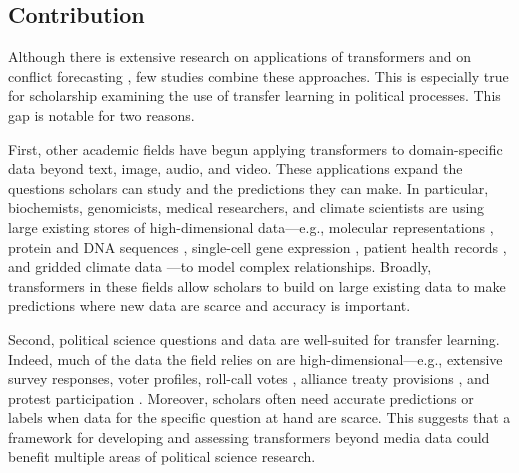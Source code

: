 \documentclass[11pt, letterpaper]{article}
\begin{document}
\subsection{Contribution}
Although there is extensive research on applications of transformers \citep{brandt2026extractive, halterman2025synthetic} and on conflict forecasting \citep{dorff2020networks, hegre2025views, mueller2018reading, radford2022highres}, few studies combine these approaches. This is especially true for scholarship examining the use of transfer learning in political processes. This gap is notable for two reasons.

First, other academic fields have begun applying transformers to domain-specific data beyond text, image, audio, and video. These applications expand the questions scholars can study and the predictions they can make. In particular, biochemists, genomicists, medical researchers, and climate scientists are using large existing stores of high-dimensional data---e.g., molecular representations \citep{chithrananda2020chemberta, schwaller2019molecular}, protein and DNA sequences \citep{ji2021dnabert, lin2023esmfold}, single-cell gene expression \citep{theodoris2023geneformer}, patient health records \citep{li2020behrt, rasmy2021medbert}, and gridded climate data \citep{nguyen2023climax, bi2023pangu}---to model complex relationships. %
Broadly, transformers in these fields allow scholars to build on large existing data to make predictions where new data are scarce and accuracy is important. 

Second, political science questions and data are well-suited for transfer learning. Indeed, much of the data the field relies on are high-dimensional---e.g., extensive survey responses, voter profiles, roll-call votes \citep{poole1985spatial}, alliance treaty provisions \citep{leeds2002atop}, and protest participation \citep{larson2019protest}. Moreover, scholars often need accurate predictions or labels when data for the specific question at hand are scarce. This suggests that a framework for developing and assessing transformers beyond media data could benefit multiple areas of political science research. 
\end{document}
